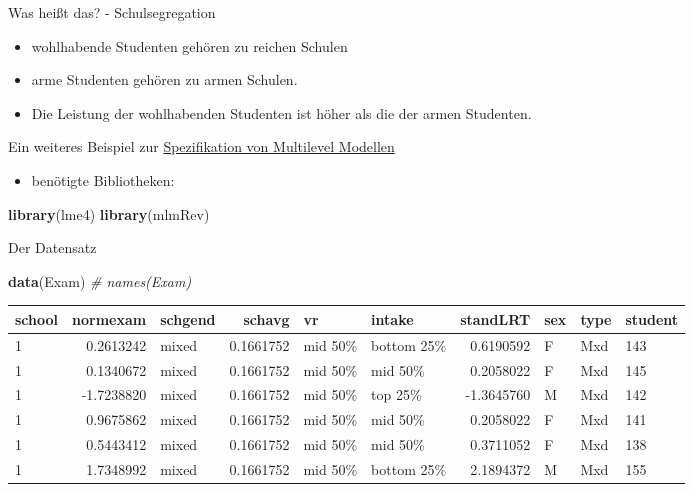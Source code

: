 \documentclass[ignorenonframetext,]{beamer}
\newenvironment{Shaded}{}{}
\newcommand{\KeywordTok}[1]{\textcolor[rgb]{0.00,0.44,0.13}{\textbf{{#1}}}}
\newcommand{\CommentTok}[1]{\textcolor[rgb]{0.38,0.63,0.69}{\textit{{#1}}}}
\newcommand{\NormalTok}[1]{{#1}}
\providecommand{\tightlist}{%
\setlength{\itemsep}{0pt}\setlength{\parskip}{0pt}}
\begin{document}
\begin{frame}{Was heißt das? - Schulsegregation}

\begin{itemize}
\item
  wohlhabende Studenten gehören zu reichen Schulen
\item
  arme Studenten gehören zu armen Schulen.
\item
  Die Leistung der wohlhabenden Studenten ist höher als die der armen
  Studenten.
\end{itemize}

\end{frame}

\begin{frame}[fragile]{Ein weiteres Beispiel zur
\href{http://www.rensenieuwenhuis.nl/r-sessions-16-multilevel-model-specification-lme4/}{Spezifikation
von Multilevel Modellen}}

\begin{itemize}
\tightlist
\item
  benötigte Bibliotheken:
\end{itemize}

\begin{Shaded}
\begin{Highlighting}[]
\KeywordTok{library}\NormalTok{(lme4)}
\KeywordTok{library}\NormalTok{(mlmRev)}
\end{Highlighting}
\end{Shaded}

\end{frame}

\begin{frame}[fragile]{Der Datensatz}

\begin{Shaded}
\begin{Highlighting}[]
\KeywordTok{data}\NormalTok{(Exam)}
\CommentTok{# names(Exam)}
\end{Highlighting}
\end{Shaded}

\begin{longtable}[]{@{}lrlrllrlll@{}}
\toprule
school & normexam & schgend & schavg & vr & intake & standLRT & sex &
type & student\tabularnewline
\midrule
\endhead
1 & 0.2613242 & mixed & 0.1661752 & mid 50\% & bottom 25\% & 0.6190592 &
F & Mxd & 143\tabularnewline
1 & 0.1340672 & mixed & 0.1661752 & mid 50\% & mid 50\% & 0.2058022 & F
& Mxd & 145\tabularnewline
1 & -1.7238820 & mixed & 0.1661752 & mid 50\% & top 25\% & -1.3645760 &
M & Mxd & 142\tabularnewline
1 & 0.9675862 & mixed & 0.1661752 & mid 50\% & mid 50\% & 0.2058022 & F
& Mxd & 141\tabularnewline
1 & 0.5443412 & mixed & 0.1661752 & mid 50\% & mid 50\% & 0.3711052 & F
& Mxd & 138\tabularnewline
1 & 1.7348992 & mixed & 0.1661752 & mid 50\% & bottom 25\% & 2.1894372 &
M & Mxd & 155\tabularnewline
\bottomrule
\end{longtable}

\end{frame}
\end{document}
